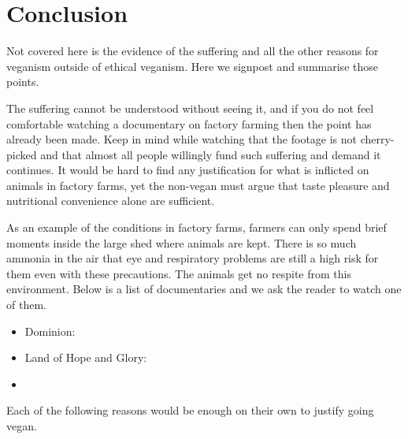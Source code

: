 
\section{Conclusion}

Not covered here is the evidence of the suffering and all the other reasons for veganism outside of ethical veganism. Here we signpost and summarise those points.

The suffering cannot be understood without seeing it, and if you do not feel comfortable watching a documentary on factory farming then the point has already been made. Keep in mind while watching that the footage is not cherry-picked and that almost all people willingly fund such suffering and demand it continues. It would be hard to find any justification for what is inflicted on animals in factory farms, yet the non-vegan must argue that taste pleasure and nutritional convenience alone are sufficient.

As an example of the conditions in factory farms, farmers can only spend brief moments inside the large shed where animals are kept. There is so much ammonia in the air that eye and respiratory problems are still a high risk for them even with these precautions. The animals get no respite from this environment. Below is a list of documentaries and we ask the reader to watch one of them.

\begin{itemize}
	\item Dominion: \url{}
	\item Land of Hope and Glory: \url{}
	\item 
\end{itemize}

Each of the following reasons would be enough on their own to justify going vegan.

